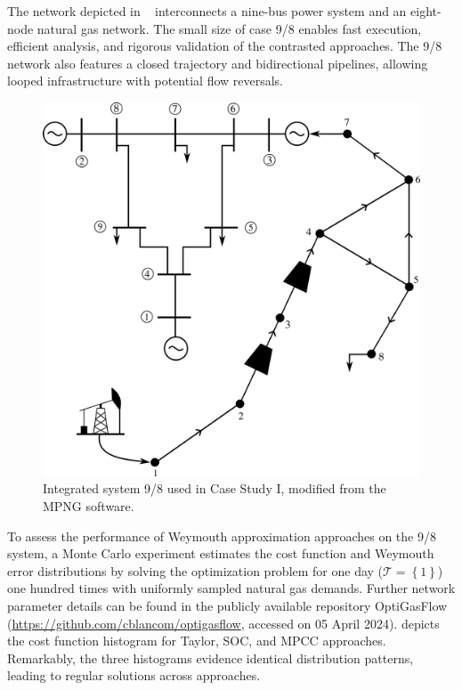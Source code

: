 The network depicted in ~\cite{Wilson_poly} interconnects a nine-bus power system and an eight-node natural gas network. The small size of case 9/8 enables fast execution, efficient analysis, and rigorous validation of the contrasted approaches. The 9/8 network also features a closed trajectory and bidirectional pipelines, allowing looped infrastructure with potential flow reversals.
\begin{figure}[H]
    \centering
    \includegraphics[scale=0.7]{figures/Chapter_MPCC/8 node 9 bus network.png}
    \caption{Integrated system 9/8 used in Case Study I, modified from the MPNG software.}
    \label{fig:8-9 network}
\end{figure}

To assess the performance of Weymouth approximation approaches on the 9/8 system, a Monte Carlo experiment estimates the cost function and Weymouth error distributions by solving the optimization problem for one day ($\mathcal{T}=\left\lbrace 1\right\rbrace$) one hundred times with uniformly sampled natural gas demands. Further network parameter details can be found in the publicly available repository OptiGasFlow ({\url{https://github.com/cblancom/optigasflow}}, accessed on 05 April 2024). 
  depicts the cost function histogram for Taylor, SOC, and MPCC approaches. Remarkably, the three histograms evidence identical distribution patterns, leading to regular solutions across approaches.

